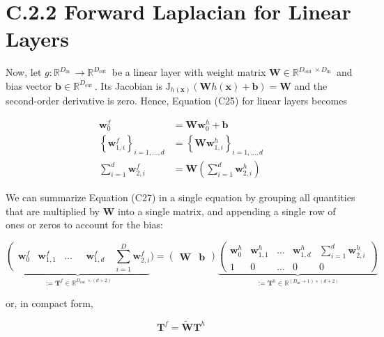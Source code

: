 \documentclass[10pt]{article}
\begin{document}
\section*{C.2.2 Forward Laplacian for Linear Layers}
Now, let $g: \mathbb{R}^{D_{\text {in }}} \rightarrow \mathbb{R}^{D_{\text {out }}}$ be a linear layer with weight matrix $\boldsymbol{W} \in \mathbb{R}^{D_{\text {out }} \times D_{\text {in }}}$ and bias vector $\boldsymbol{b} \in \mathbb{R}^{D_{\text {out }}}$. Its Jacobian is $\mathrm{J}_{h(\boldsymbol{x})}(\boldsymbol{W} h(\boldsymbol{x})+\boldsymbol{b})=\boldsymbol{W}$ and the second-order derivative is zero. Hence, Equation (C25) for linear layers becomes


\begin{align*}
\boldsymbol{w}_{0}^{f} & =\boldsymbol{W} \boldsymbol{w}_{0}^{h}+\boldsymbol{b}  \tag{C27a}\\
\left\{\boldsymbol{w}_{1, i}^{f}\right\}_{i=1, \ldots, d} & =\left\{\boldsymbol{W} \boldsymbol{w}_{1, i}^{h}\right\}_{i=1, \ldots, d}  \tag{C27b}\\
\sum_{i=1}^{d} \boldsymbol{w}_{2, i}^{f} & =\boldsymbol{W}\left(\sum_{i=1}^{d} \boldsymbol{w}_{2, i}^{h}\right) \tag{C27c}
\end{align*}


We can summarize Equation (C27) in a single equation by grouping all quantities that are multiplied by $\boldsymbol{W}$ into a single matrix, and appending a single row of ones or zeros to account for the bias:

$$
\underbrace{\left(\begin{array}{lll}
\boldsymbol{w}_{0}^{f} & \boldsymbol{w}_{1,1}^{f} & \ldots
\end{array} \quad \boldsymbol{w}_{1, d}^{f} \quad \sum_{i=1}^{D} \boldsymbol{w}_{2, i}^{f}\right.}_{:=\boldsymbol{T}^{f} \in \mathbb{R}^{D_{\text {out }} \times(d+2)}})=\left(\begin{array}{ll}
\boldsymbol{W} & \boldsymbol{b}
\end{array}\right) \underbrace{\left(\begin{array}{ccccc}
\boldsymbol{w}_{0}^{h} & \boldsymbol{w}_{1,1}^{h} & \ldots & \boldsymbol{w}_{1, d}^{h} & \sum_{i=1}^{d} \boldsymbol{w}_{2, i}^{h} \\
1 & 0 & \ldots & 0 & 0
\end{array}\right)}_{:=\boldsymbol{T}^{h} \in \mathbb{R}^{\left(D_{\text {in }}+1\right) \times(d+2)}}
$$

or, in compact form,


\begin{equation*}
\boldsymbol{T}^{f}=\tilde{\boldsymbol{W}} \boldsymbol{T}^{h} \tag{C28}
\end{equation*}
\end{document}
